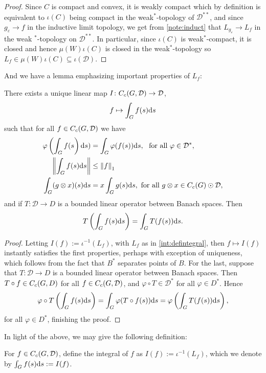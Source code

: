 \begin{proof}
Since $C$ is compact and convex, it is weakly compact which by definition is equivalent to $\iota(C)$ being compact in the weak$^*$-topology of $\mathcal{D}^{**}$, and since $g_{\varepsilon} \to f$ in the inductive limit topology, we get from \ref{note:induct} that $L_{g_\varepsilon } \to L_f$ in the weak $^*$-topology on $\mathcal{D}^{**}$. In particular, since $\iota(C)$ is weak$^*$-compact, it is closed and hence $\mu(W) \iota(C)$ is closed in the weak$^*$-topology so $L_f \in \mu(W) \iota(C) \subseteq \iota(\mathcal{D})$.
\end{proof}
And we have a lemma emphasizing important properties of $L_f$:
\begin{lemma}
There exists a unique linear map $I \colon C_c(G,\mathcal{D}) \to \mathcal{D}$,
\begin{align*}
f \mapsto \int_G f(s) \mathrm{d} s
\end{align*}
such that for all $f \in C_c(G,\mathcal{D})$ we have
\begin{align}
\varphi\left(\int_G f(s\right) \mathrm{d} s ) &= \int_G \varphi(f(s)) \mathrm{d} s, \ \text{ for all } \varphi \in \mathcal{D}^*,\\
\left\lVert \int_G f(s) \mathrm{d} s \right\rVert &\leq \left\lVert f \right\rVert_1 \\
\int_G (g \otimes x) (s) \mathrm{d} s &=x \int_G g(s) \mathrm{d} s, \text{ for all } g \otimes x \in C_c(G) \odot \mathcal{D},
\end{align}
and if $T \colon \mathcal{D} \to D$ is a bounded linear operator between Banach spaces. Then
\begin{align*}
T\left( \int_G f(s) \mathrm{d} s \right) = \int_G T(f(s)) \mathrm{d} s.
\end{align*}
\label{int:bochnerproperties}
\end{lemma}
\begin{proof}
Letting $I(f) := \iota^{-1}(L_f)$, with $L_f$ as in \ref{int:defintegral}, then $f \mapsto I(f)$ instantly satisfies the first properties, perhaps with exception of uniqueness, which follows from the fact that $B^*$ separates points of $B$. For the last, suppose that $T \colon \mathcal{D} \to D$ is a bounded linear operator between Banach spaces. Then $T \circ f \in C_c(G,D)$ for all $f \in C_c(G,\mathcal{D})$, and $\varphi \circ T \in \mathcal{D}^*$ for all $ \varphi \in D^*$. Hence 
\begin{align*}
	\varphi \circ T \left( \int_G f(s) \mathrm{d} s  \right) = \int_G \varphi( T \circ f (s) ) \mathrm{d} s = \varphi \left( \int_G T (f(s)) \mathrm{d} s \right),
\end{align*}
for all $\varphi \in D^*$, finishing the proof.
\end{proof}
In light of the above, we may give the following definition:
\begin{definition}
For $f \in C_c(G,\mathcal{D})$, define the integral of $f$ as $I(f) := \iota^{-1}(L_f)$, which we denote by $\int_G f(s) \mathrm{d} s := I(f)$.
\end{definition}

